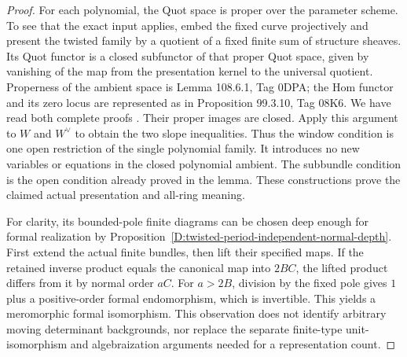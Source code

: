 \begin{proof}
For each polynomial, the Quot space is proper over the
parameter scheme. To see that the exact input applies,
embed the fixed curve projectively and present the twisted
family by a quotient of a fixed finite sum of structure
sheaves. Its Quot functor is a closed subfunctor of that
proper Quot space, given by vanishing of the map from the
presentation kernel to the universal quotient. Properness
of the ambient space is Lemma 108.6.1, Tag 0DPA; the Hom
functor and its zero locus are represented as in Proposition
99.3.10, Tag 08K6. We have read both complete proofs
\citep{C_StacksBoundedReflexive}. Their proper images are
closed. Apply this argument to $W$ and $W^\vee$ to obtain
the two slope inequalities. Thus the window condition is
one open restriction of the single polynomial family.
It introduces no new variables or equations in the closed
polynomial ambient.
The subbundle condition is the open condition already proved
in the lemma. These constructions prove the claimed actual
presentation and all-ring meaning.

For clarity, its bounded-pole finite diagrams can be chosen
deep enough for formal realization by
Proposition~\ref{D:twisted-period-independent-normal-depth}.
First extend the actual finite bundles, then lift their
specified maps. If the retained inverse product equals
the canonical map into $2BC$, the lifted product differs
from it by normal order $aC$. For $a>2B$, division by the
fixed pole gives $1$ plus a positive-order formal endomorphism,
which is invertible. This yields a meromorphic formal
isomorphism. This observation does not identify arbitrary
moving determinant backgrounds, nor replace the separate
finite-type unit-isomorphism and algebraization arguments
needed for a representation count.
\end{proof}
